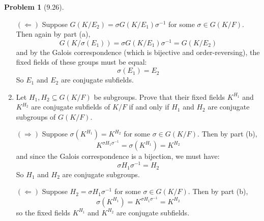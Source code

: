 \documentclass[12pt]{article}
\theoremstyle{definition}
\newtheorem{problem}{Problem}
\begin{document}
\begin{problem}[9.26]
\begin{enumerate}[label=(\alph*)]
\begin{solution}
            $(\Leftarrow)$ Suppose $G(K/E_2) = \sigma G(K/E_1) \sigma^{-1}$ for some $\sigma \in G(K/F)$. Then again by part (a),
            \[
            G(K/\sigma(E_1)) = \sigma G(K/E_1) \sigma^{-1} = G(K/E_2)
            \]
            and by the Galois correspondence (which is bijective and order-reversing), the fixed fields of these groups must be equal:
            \[
            \sigma(E_1) = E_2
            \]
            So $E_1$ and $E_2$ are conjugate subfields.
        \end{solution}

        \item Let $H_1, H_2 \subseteq G(K/F)$ be subgroups. Prove that their fixed fields $K^{H_1}$ and $K^{H_2}$
              are conjugate subfields of $K/F$ if and only if $H_1$ and $H_2$ are conjugate subgroups of $G(K/F)$.
        \begin{solution}
            $(\Rightarrow)$ Suppose $\sigma(K^{H_1}) = K^{H_2}$ for some $\sigma \in G(K/F)$. Then by part (b),
            \[
            K^{\sigma H_1 \sigma^{-1}} = \sigma(K^{H_1}) = K^{H_2}
            \]
            and since the Galois correspondence is a bijection, we must have:
            \[
            \sigma H_1 \sigma^{-1} = H_2
            \]
            So $H_1$ and $H_2$ are conjugate subgroups.

            $(\Leftarrow)$ Suppose $H_2 = \sigma H_1 \sigma^{-1}$ for some $\sigma \in G(K/F)$. Then by part (b),
            \[
            \sigma(K^{H_1}) = K^{\sigma H_1 \sigma^{-1}} = K^{H_2}
            \]
            so the fixed fields $K^{H_1}$ and $K^{H_2}$ are conjugate subfields.
        \end{solution}
    \end{enumerate}
\end{problem}
\end{document}
